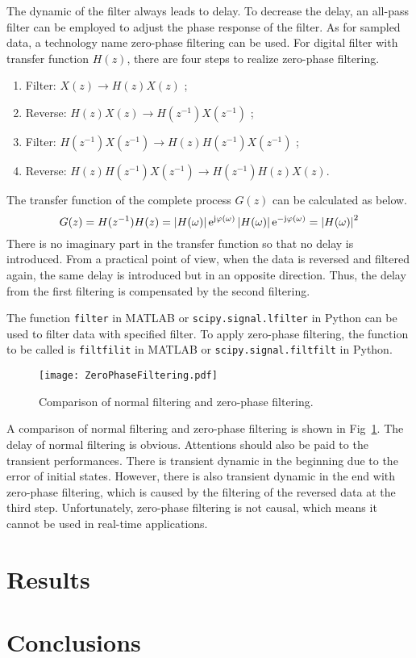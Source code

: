 The dynamic of the filter always leads to delay. To decrease the delay, an all-pass filter can be employed to adjust the phase response of the filter. As for sampled data, a technology name zero-phase filtering can be used. For digital filter with transfer function $H(z)$, there are four steps to realize zero-phase filtering.
\begin{enumerate}
    \setlength{\itemsep}{0pt}
    \item Filter: $X(z) \rightarrow H(z)X(z)$ ;
    \item Reverse: $H(z)X(z) \rightarrow H(z^{-1})X(z^{-1})$ ;
    \item Filter: $H(z^{-1})X(z^{-1}) \rightarrow H(z)H(z^{-1})X(z^{-1})$ ;
    \item Reverse: $H(z)H(z^{-1})X(z^{-1}) \rightarrow H(z^{-1})H(z)X(z)$.
\end{enumerate}
The transfer function of the complete process $G(z)$ can be calculated as below.
\begin{equation}
    G(z) = H(z^{-1})H(z) = \left| H(\omega) \right| \mathrm{e}^{\mathrm{j} \varphi (\omega)} \left| H(\omega) \right| \mathrm{e}^{-\mathrm{j} \varphi (\omega)}  = \left| H(\omega) \right|^2
\end{equation}
There is no imaginary part in the transfer function so that no delay is introduced. From a practical point of view, when the data is reversed and filtered again, the same delay is introduced but in an opposite direction. Thus, the delay from the first filtering is compensated by the second filtering.


The function \verb|filter| in MATLAB or \verb|scipy.signal.lfilter| in Python can be used to filter data with specified filter. To apply zero-phase filtering, the function to be called is \verb|filtfilit| in MATLAB or \verb|scipy.signal.filtfilt| in Python. 


\begin{figure}[!htb]
    \centering
    \texttt{[image: ZeroPhaseFiltering.pdf]}
    \caption{Comparison of normal filtering and zero-phase filtering.}
    \label{fig:zerofiltering}
\end{figure}


A comparison of normal filtering and zero-phase filtering is shown in Fig~\ref{fig:zerofiltering}. The delay of normal filtering is obvious. Attentions should also be paid to the transient performances. There is transient dynamic in the beginning due to the error of initial states. However, there is also transient dynamic in the end with zero-phase filtering, which is caused by the filtering of the reversed data at the third step. Unfortunately, zero-phase filtering is not causal, which means it cannot be used in real-time applications.





\section{Results}




\section{Conclusions}





